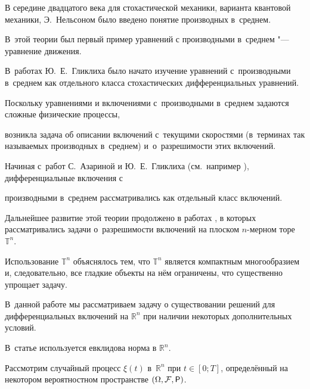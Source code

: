 





В середине двадцатого века для стохастической механики, варианта  квантовой механики, Э.~Нельсоном было введено понятие производных в~среднем. 

В~этой теории был первый пример уравнений с производными в~среднем "--- уравнение движения. 

В~работах Ю.~Е.~Гликлиха \cite{popovkoval:bib:G1} было начато изучение уравнений с~производными в~среднем как отдельного класса стохастических дифференциальных уравнений. 

Поскольку уравнениями и включениями с~производными в~среднем задаются сложные физические процессы, 

возникла задача об описании включений с~текущими скоростями (в~терминах так называемых производных в~среднем) и~о~разрешимости этих включений. 

Начиная с~работ С.~Азариной и Ю.~Е.~Гликлиха (см.~например \cite{popovkoval:bib:AG1}), дифференциальные включения с

производными в~среднем рассматривались как отдельный класс включений. 

Дальнейшее развитие этой теории продолжено в работах \cite{popovkoval:bib:MG1, popovkoval:bib:MG4,  popovkoval:bib:alla,popovkoval:bib:GM2015r, popovkoval:bib:MG8, popovkoval:bib:MG10}, в которых рассматривались задачи о~разрешимости включений на плоском $n$-мерном торе $\mathbb{T}^n$.

Использование $\mathbb{T}^n$ объяснялось тем, что $\mathbb{T}^n$ является компактным многообразием и, следовательно, все гладкие объекты на нём ограничены, что существенно упрощает задачу. 



В~данной работе мы рассматриваем задачу о существовании решений для дифференциальных включений на $\mathbb{R}^n$ при наличии некоторых дополнительных условий. 

В~статье используется евклидова норма в $\mathbb{R}^n$.



\smallskip




Рассмотрим случайный процесс $\xi(t)$ в~$\mathbb{R}^n$ при $t\in [0; T]$, определённый на некотором вероятностном пространстве  $(\Omega,{\cal F},{\sf P})$.



